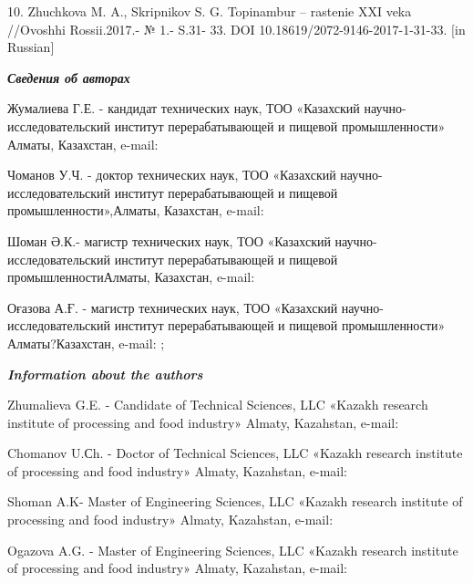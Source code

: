 10. Zhuchkova M. A., Skripnikov S. G. Topinambur -- rastenie XXI veka
//Ovoshhi Rossii.2017.- № 1.- S.31- 33. DOI
10.18619/2072-9146-2017-1-31-33. {[}in Russian{]}

\emph{{\bfseries Сведения об авторах}}

Жумалиева Г.Е. - кандидат технических наук, ТОО «Казахский
научно-исследовательский институт перерабатывающей и пищевой
промышленности» Алматы, Казахстан, e-mail:

\href{https://orcid.org/0000-0002-5028-465X}{}

Чоманов У.Ч. - доктор технических наук, ТОО «Казахский
научно-исследовательский институт перерабатывающей и пищевой
промышленности»,Алматы, Казахстан, e-mail:

\href{https://orcid.org/0000-0002-5594-8216}{}

Шоман Ә.К.- магистр технических наук, ТОО «Казахский
научно-исследовательский институт перерабатывающей и пищевой
промышленностиАлматы, Казахстан, e-mail: 

Оғазова А.Ғ. - магистр технических наук, ТОО «Казахский
научно-исследовательский институт перерабатывающей и пищевой
промышленности» Алматы?Казахстан, e-mail:
\href{mailto:o.aidana_01@mail.ru}{};


\emph{{\bfseries Information about the authors}}

Zhumalieva G.E. - Candidate of Technical Sciences, LLC «Kazakh research
institute of processing and food industry» Almaty, Kazahstan, e-mail:


Chomanov U.Сh. - Doctor of Technical Sciences, LLC «Kazakh research
institute of processing and food industry» Almaty, Kazahstan, e-mail:


Shoman A.K- Master of Engineering Sciences, LLC «Kazakh research
institute of processing and food industry» Almaty, Kazahstan, e-mail:
\href{mailto:shoman_a@mail.ru;\%20}{}

Ogazova A.G. - Master of Engineering Sciences, LLC «Kazakh research
institute of processing and food industry» Almaty, Kazahstan, e-mail:\